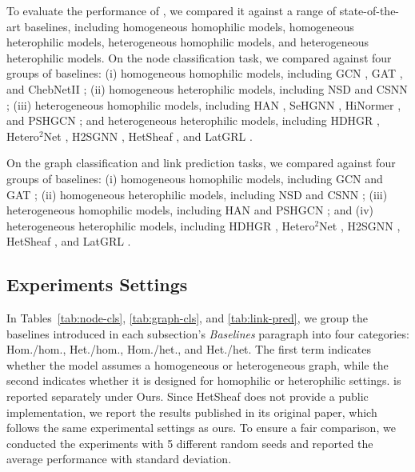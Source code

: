 To evaluate the performance of \method{}, we compared it against a range of state-of-the-art baselines, including homogeneous homophilic models, homogeneous heterophilic models, heterogeneous homophilic models, and heterogeneous heterophilic models.
On the node classification task, we compared \method{} against four groups of baselines: (i) homogeneous homophilic models, including GCN
\cite{kipf2017gcn}, GAT \cite{velickovic2018gat}, and ChebNetII \cite{he2022chebnetii}; (ii) homogeneous heterophilic models, including NSD
\cite{bodnar2022neural} and CSNN \cite{ribeiro2026cooperative}; (iii)
heterogeneous homophilic models, including HAN \cite{wang2019han}, SeHGNN \cite{yang2023sehgnn},
HiNormer \cite{mao2023hinormer}, and PSHGCN \cite{he2024spectral}; and heterogeneous heterophilic models, including HDHGR \cite{guo2023homophily}, Hetero$^2$Net \cite{li2025hetero2net}, H2SGNN
\cite{lu2026addressing}, HetSheaf \cite{braithwaite2024heterogeneous}, and LatGRL
\cite{shen2025heterophily}.

On the graph classification and link prediction tasks, we compared \method{} against four groups of baselines: (i) homogeneous homophilic models, including GCN \cite{kipf2017gcn} and GAT \cite{velickovic2018gat}; (ii) homogeneous heterophilic models, including NSD \cite{bodnar2022neural} and CSNN \cite{ribeiro2026cooperative}; (iii) heterogeneous homophilic models, including HAN \cite{wang2019han} and PSHGCN \cite{he2024spectral}; and (iv) heterogeneous heterophilic models, including HDHGR \cite{guo2023homophily}, Hetero$^2$Net \cite{li2025hetero2net}, H2SGNN \cite{lu2026addressing}, HetSheaf \cite{braithwaite2024heterogeneous}, and LatGRL \cite{shen2025heterophily}.





\subsection{Experiments Settings}

In Tables~\ref{tab:node-cls}, \ref{tab:graph-cls}, and \ref{tab:link-pred}, we group the baselines introduced in each subsection’s \emph{Baselines} paragraph into four categories: Hom./hom., Het./hom., Hom./het., and Het./het. The first term indicates whether the model assumes a homogeneous or heterogeneous graph, while the second indicates whether it is designed for homophilic or heterophilic settings. \method{} is reported separately under Ours. Since HetSheaf does not provide a public implementation, we report the results published in its original paper, which follows the same experimental settings as ours. To ensure a fair comparison, we conducted the experiments with 5 different random seeds and reported the average performance with standard deviation.


